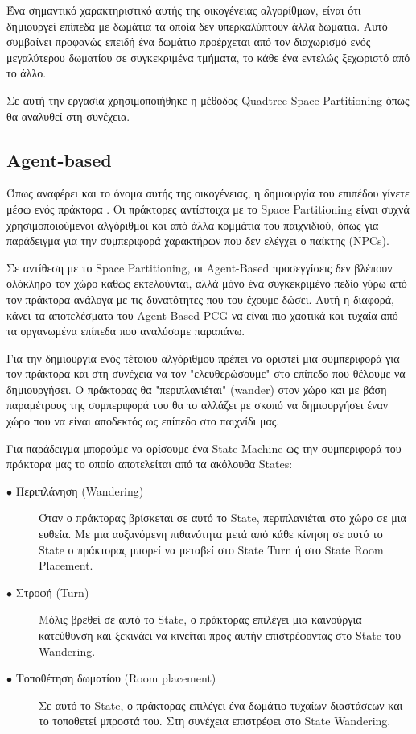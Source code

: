Ένα σημαντικό χαρακτηριστικό αυτής της οικογένειας αλγορίθμων, είναι ότι δημιουργεί επίπεδα με δωμάτια τα οποία δεν υπερκαλύπτουν άλλα δωμάτια. Αυτό συμβαίνει προφανώς επειδή ένα δωμάτιο προέρχεται από τον διαχωρισμό ενός μεγαλύτερου δωματίου σε συγκεκριμένα τμήματα, το κάθε ένα εντελώς ξεχωριστό από το άλλο.
\par
Σε αυτή την εργασία χρησιμοποιήθηκε η μέθοδος Quadtree Space Partitioning όπως θα αναλυθεί στη συνέχεια.


\subsection{Agent-based}
Όπως αναφέρει και το όνομα αυτής της οικογένειας, η δημιουργία του επιπέδου γίνετε μέσω ενός πράκτορα \cite{agents}. Οι πράκτορες αντίστοιχα με το Space Partitioning είναι συχνά χρησιμοποιούμενοι αλγόριθμοι και από άλλα κομμάτια του παιχνιδιού, όπως για παράδειγμα για την συμπεριφορά χαρακτήρων που δεν ελέγχει ο παίκτης (NPCs).
\par
Σε αντίθεση με το Space Partitioning, οι Agent-Based προσεγγίσεις δεν βλέπουν ολόκληρο τον χώρο καθώς εκτελούνται, αλλά μόνο ένα συγκεκριμένο πεδίο γύρω από τον πράκτορα ανάλογα με τις δυνατότητες που του έχουμε δώσει. Αυτή η διαφορά, κάνει τα αποτελέσματα του Agent-Based PCG να είναι πιο χαοτικά και τυχαία από τα οργανωμένα επίπεδα που αναλύσαμε παραπάνω.
\par
Για την δημιουργία ενός τέτοιου αλγόριθμου πρέπει να οριστεί μια συμπεριφορά για τον πράκτορα και στη συνέχεια να τον "ελευθερώσουμε" στο επίπεδο που θέλουμε να δημιουργήσει. Ο πράκτορας θα "περιπλανιέται" (wander) στον χώρο και με βάση παραμέτρους της συμπεριφορά του θα το αλλάζει με σκοπό να δημιουργήσει έναν χώρο που να είναι αποδεκτός ως επίπεδο στο παιχνίδι μας.
\par
Για παράδειγμα μπορούμε να ορίσουμε ένα State Machine ως την συμπεριφορά του πράκτορα μας το οποίο αποτελείται από τα ακόλουθα States:
\begin{description}
  \item[$\bullet$ Περιπλάνηση (Wandering)] Όταν ο πράκτορας βρίσκεται σε αυτό το State, περιπλανιέται στο χώρο σε μια ευθεία. Με μια αυξανόμενη πιθανότητα μετά από κάθε κίνηση σε αυτό το State ο πράκτορας μπορεί να μεταβεί στο State Turn ή στο State Room Placement.
  \item[$\bullet$ Στροφή (Turn)] Μόλις βρεθεί σε αυτό το State, ο πράκτορας επιλέγει μια καινούργια κατεύθυνση και ξεκινάει να κινείται προς αυτήν επιστρέφοντας στο State του Wandering. 
    \item[$\bullet$ Τοποθέτηση δωματίου (Room placement)] Σε αυτό το State, ο πράκτορας επιλέγει ένα δωμάτιο τυχαίων διαστάσεων και το τοποθετεί μπροστά του. Στη συνέχεια επιστρέφει στο State Wandering.
\end{description}
